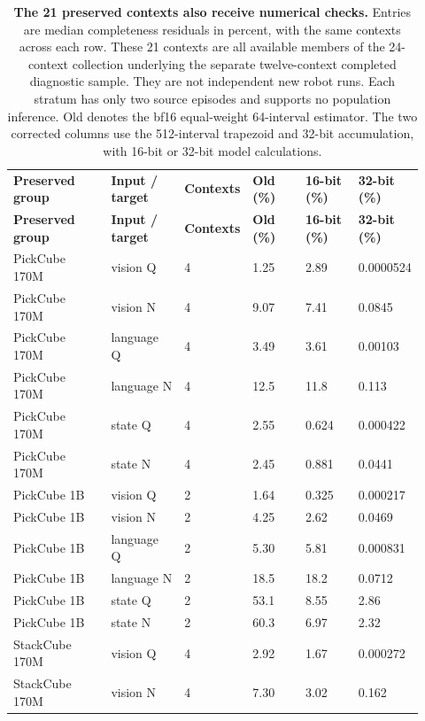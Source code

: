\setlength{\tabcolsep}{2pt}
\begin{longtable}{p{0.240\linewidth} p{0.180\linewidth} p{0.100\linewidth} p{0.130\linewidth} p{0.130\linewidth} p{0.140\linewidth}}
\noalign{\addtocounter{table}{-1}}
\caption*{\textbf{The 21 preserved contexts also receive numerical checks.} Entries are median completeness residuals in percent, with the same contexts across each row. These 21 contexts are all available members of the 24-context collection underlying the separate twelve-context completed diagnostic sample. They are not independent new robot runs. Each stratum has only two source episodes and supports no population inference. Old denotes the bf16 equal-weight 64-interval estimator. The two corrected columns use the 512-interval trapezoid and 32-bit accumulation, with 16-bit or 32-bit model calculations.}\\
\toprule
\textbf{Preserved group} & \textbf{Input / target} & \textbf{Contexts} & \textbf{Old (\%)} & \textbf{16-bit (\%)} & \textbf{32-bit (\%)} \\
\midrule\endfirsthead
\toprule
\textbf{Preserved group} & \textbf{Input / target} & \textbf{Contexts} & \textbf{Old (\%)} & \textbf{16-bit (\%)} & \textbf{32-bit (\%)} \\
\midrule\endhead
\bottomrule\endfoot
PickCube 170M & vision Q & 4 & 1.25 & 2.89 & 0.0000524 \\
PickCube 170M & vision N & 4 & 9.07 & 7.41 & 0.0845 \\
PickCube 170M & language Q & 4 & 3.49 & 3.61 & 0.00103 \\
PickCube 170M & language N & 4 & 12.5 & 11.8 & 0.113 \\
PickCube 170M & state Q & 4 & 2.55 & 0.624 & 0.000422 \\
PickCube 170M & state N & 4 & 2.45 & 0.881 & 0.0441 \\
PickCube 1B & vision Q & 2 & 1.64 & 0.325 & 0.000217 \\
PickCube 1B & vision N & 2 & 4.25 & 2.62 & 0.0469 \\
PickCube 1B & language Q & 2 & 5.30 & 5.81 & 0.000831 \\
PickCube 1B & language N & 2 & 18.5 & 18.2 & 0.0712 \\
PickCube 1B & state Q & 2 & 53.1 & 8.55 & 2.86 \\
PickCube 1B & state N & 2 & 60.3 & 6.97 & 2.32 \\
StackCube 170M & vision Q & 4 & 2.92 & 1.67 & 0.000272 \\
StackCube 170M & vision N & 4 & 7.30 & 3.02 & 0.162 \\

\end{longtable}
